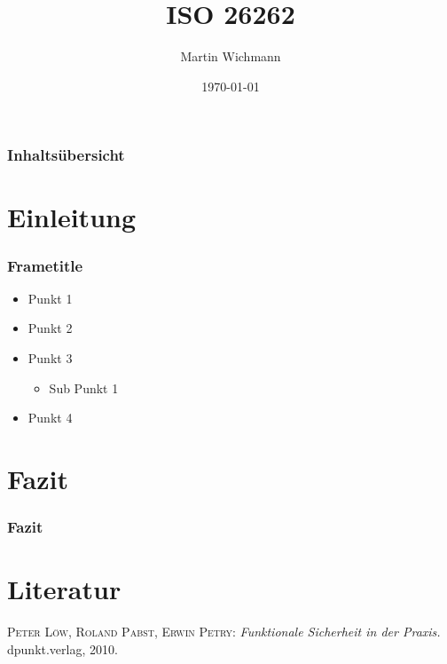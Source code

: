 \documentclass[]{beamer}
\author{Martin Wichmann}
\title{ISO 26262}
\date{\today}
\institute{Ostfalia Hochschule für angewandte Wissenschaften}
\begin{document}
\begin{frame}
\maketitle
\end{frame}


\begin{frame}
\frametitle{Inhaltsübersicht}
\tableofcontents
\end{frame}





\section{Einleitung}
\label{sec:einleitung}

\begin{frame}
\frametitle{Frametitle}
\begin{itemize}
    \item Punkt 1
    \item Punkt 2
    \item Punkt 3\cite{1}
    \begin{itemize}
        \item Sub Punkt 1
    \end{itemize}
    \item Punkt 4
\end{itemize}
\end{frame}

\section{Fazit}
\label{sec:Fazit}

\begin{frame}
\frametitle{Fazit}


\end{frame}








\appendix
\section*{Literatur}
\label{sec:Literatur}

\begin{frame}
\begin{thebibliography}{10}

 \textsc{Peter Löw, Roland Pabst, Erwin Petry}: {\em Funktionale Sicherheit in der Praxis.} dpunkt.verlag, 2010.

\end{thebibliography}
\end{frame}
\end{document}

